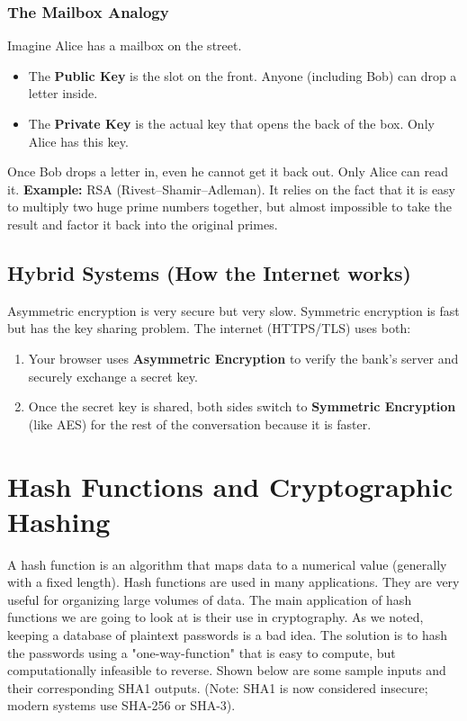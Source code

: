 \documentclass[11pt,a4paper]{report}
\begin{document}
\subsubsection{The Mailbox Analogy}
Imagine Alice has a mailbox on the street.
\begin{itemize}
    \item The \textbf{Public Key} is the slot on the front. Anyone (including Bob) can drop a letter inside.
    \item The \textbf{Private Key} is the actual key that opens the back of the box. Only Alice has this key.
\end{itemize}
Once Bob drops a letter in, even he cannot get it back out. Only Alice can read it.
\textbf{Example:} RSA (Rivest–Shamir–Adleman). It relies on the fact that it is easy to multiply two huge prime numbers together, but almost impossible to take the result and factor it back into the original primes.

\subsection{Hybrid Systems (How the Internet works)}
Asymmetric encryption is very secure but very slow. Symmetric encryption is fast but has the key sharing problem.
The internet (HTTPS/TLS) uses both:
\begin{enumerate}
    \item Your browser uses \textbf{Asymmetric Encryption} to verify the bank's server and securely exchange a secret key.
    \item Once the secret key is shared, both sides switch to \textbf{Symmetric Encryption} (like AES) for the rest of the conversation because it is faster.
\end{enumerate}

\newpage
\section{Hash Functions and Cryptographic Hashing}

A hash function is an algorithm that maps data to a numerical value (generally with a fixed length).
Hash functions are used in many applications. They are very useful for organizing large volumes of data.
The main application of hash functions we are going to look at is their use in cryptography.
As we noted, keeping a database of plaintext passwords is a bad idea.
The solution is to hash the passwords using a "one-way-function" that is easy to compute, but computationally infeasible to reverse.
Shown below are some sample inputs and their corresponding SHA1 outputs. (Note: SHA1 is now considered insecure; modern systems use SHA-256 or SHA-3).
\end{document}
